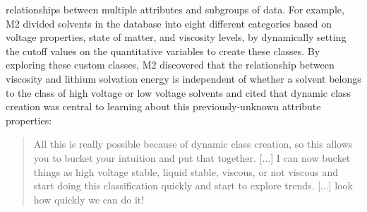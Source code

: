 relationships between multiple attributes and subgroups of data.
For example, M2 divided solvents in the database
into eight different categories based on voltage properties,
state of matter, and viscosity levels,
by dynamically setting the cutoff values
on the quantitative variables to create these classes.
By exploring these custom classes, M2 discovered that the relationship between viscosity and lithium solvation energy is independent of whether a solvent belongs to the class of high voltage or low voltage solvents and cited that dynamic class creation was central to learning about this previously-unknown attribute properties:
\begin{quote}
All this is really possible because of dynamic class creation, so this allows you to bucket your intuition and put that together. [...] I can now bucket things as high voltage stable, liquid stable, viscous, or not viscous and start doing this classification quickly and start to explore trends. [...] look how quickly we can do it!%
\end{quote}
